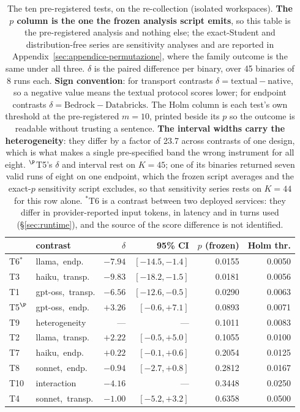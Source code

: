 \begin{table}[t]
\caption{The ten pre-registered tests, on the re-collection (isolated workspaces). \textbf{The $p$ column is the one the frozen analysis script emits}, so this table is the pre-registered analysis and nothing else; the exact-Student and distribution-free series are sensitivity analyses and are reported in Appendix~\ref{sec:appendice-permutazione}, where the family outcome is the same under all three. $\delta$ is the paired difference per binary, over 45 binaries of 8 runs each. \textbf{Sign convention}: for transport contrasts $\delta = \text{textual} - \text{native}$, so a negative value means the textual protocol scores lower; for endpoint contrasts $\delta = \text{Bedrock} - \text{Databricks}$. The Holm column is each test's own threshold at the pre-registered $m{=}10$, printed beside its $p$ so the outcome is readable without trusting a sentence. \textbf{The interval widths carry the heterogeneity}: they differ by a factor of 23.7 across contrasts of one design, which is what makes a single pre-specified band the wrong instrument for all eight. $^{\P}$T5's $\delta$ and interval rest on $K{=}45$; one of its binaries returned seven valid runs of eight on one endpoint, which the frozen script averages and the exact-$p$ sensitivity script excludes, so that sensitivity series rests on $K{=}44$ for this row alone. $^{\ast}$T6 is a contrast between two deployed services: they differ in provider-reported input tokens, in latency and in turns used (\S\ref{sec:runtime}), and the source of the score difference is not identified.}
\label{tab:tests}
\centering
\scriptsize
\setlength{\tabcolsep}{2.6pt}
\begin{tabular}{llrrrr}
\toprule
& contrast & $\delta$ & 95\% CI & $p$ (frozen) & Holm thr. \\
\midrule
T6$^{\ast}$ & llama,\, endp. & $-7.94$ & $[-14.5,-1.4]$ & 0.0155 & 0.0050 \\
T3 & haiku,\, transp. & $-9.83$ & $[-18.2,-1.5]$ & 0.0181 & 0.0056 \\
T1 & gpt-oss,\, transp. & $-6.56$ & $[-12.6,-0.5]$ & 0.0290 & 0.0063 \\
T5$^{\P}$ & gpt-oss,\, endp. & $+3.26$ & $[-0.6,+7.1]$ & 0.0893 & 0.0071 \\
T9 & heterogeneity & --- & --- & 0.1011 & 0.0083 \\
T2 & llama,\, transp. & $+2.22$ & $[-0.5,+5.0]$ & 0.1055 & 0.0100 \\
T7 & haiku,\, endp. & $+0.22$ & $[-0.1,+0.6]$ & 0.2054 & 0.0125 \\
T8 & sonnet,\, endp. & $-0.94$ & $[-2.7,+0.8]$ & 0.2812 & 0.0167 \\
T10 & interaction & $-4.16$ & --- & 0.3448 & 0.0250 \\
T4 & sonnet,\, transp. & $-1.00$ & $[-5.2,+3.2]$ & 0.6358 & 0.0500 \\
\bottomrule
\end{tabular}
\end{table}
